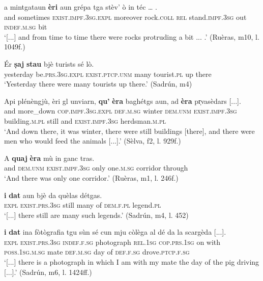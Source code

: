 \ea
\label{ex:exist.essar3}
\gll   [...] a mintgataun \textbf{èri} aun grépa tga stèv’ ò in téc … . \\
{} and sometimes  \textsc{exist.impf.3sg.expl} moreover rock.\textsc{coll} \textsc{rel}  stand.\textsc{impf.3sg}  out \textsc{indef.m.sg} bit\\
\glt `[...] and from time to time there were rocks protruding a bit ... .' (Ruèras, m10, l. 1049f.)
\z

\ea
\label{ex:exist.essar4}
\gll Ér \textbf{ṣaj} \textbf{stau} bjè turists sé lò.\\
yesterday be.\textsc{prs.3sg.expl} \textsc{exist.ptcp.unm} many tourist.\textsc{pl} up there\\
\glt `Yesterday there were many tourists up there.' (Sadrún, m4)
\z

\ea
\label{ex:exist.essar5}
\gll    Api plénèngjù, èri gl unviarn, \textbf{qu’} \textbf{èra} baghétgs aun, ad \textbf{èra} pr̩vasèdars [...].\\
and more\_down \textsc{cop.impf.3sg.expl} \textsc{def.m.sg} winter \textsc{dem.unm} \textsc{exist.impf.3sg} building.\textsc{m.pl} still and \textsc{exist.impf.3sg} herdsman.\textsc{m.pl} \\
\glt `And down there, it was winter, there were still buildings [there], and there were men who would feed the animals [...].' (Sèlva, f2, l. 929f.)
\z

\ea
\label{ex:exist.essar6}
\gll    A \textbf{quaj} \textbf{èra} mù in ganc tras.\\
and \textsc{dem.unm} \textsc{exist.impf.3sg} only one.\textsc{m.sg} corridor through\\
\glt `And there was only one corridor.' (Ruèras, m1, l. 246f.)
\z

\ea
\label{ex:exist.da1}
\gll  [...] \textbf{i} \textbf{dat} aun bjè da quèlas détgas.  \\
{} \textsc{expl} \textsc{exist.prs.3sg} still many of  \textsc{dem.f.pl} legend.\textsc{pl}\\
\glt `[...] there still are many such legends.' (Sadrún, m4, l. 452)
\z

\ea
\label{ex:exist.da2}
\gll    [...] \textbf{i} \textbf{dat} ina fòtògrafia tgu sùn sé cun mju còlèga al dé da la scargèda [...].\\
{} \textsc{expl} \textsc{exist.prs.3sg}  \textsc{indef.f.sg} photograph \textsc{rel.1sg}  \textsc{cop.prs.1sg} on with \textsc{poss.1sg.m.sg} mate \textsc{def.m.sg} day of  \textsc{def.f.sg}  drove.\textsc{ptcp.f.sg}\\
\glt `[...] there is a photograph in which I am with my mate the day of the pig driving [...].' (Sadrún, m6, l. 1424ff.)
\z

